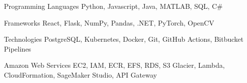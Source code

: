 
\begin{cvskills}
  \cvskill 
    {Programming Languages}
    {Python, Javascript, Java, MATLAB, SQL, C\#}

  \cvskill
    {Frameworks}
    {React, Flask, NumPy, Pandas, .NET, PyTorch, OpenCV}

    \cvskill 
    {Technologies}
    {PostgreSQL, Kubernetes, Docker, Git, GitHub Actions, Bitbucket Pipelines}


    \cvskill 
    {Amazon Web Services}
    {EC2, IAM, ECR, EFS, RDS, S3 Glacier, Lambda, CloudFormation, SageMaker Studio, API Gateway}


\end{cvskills}
